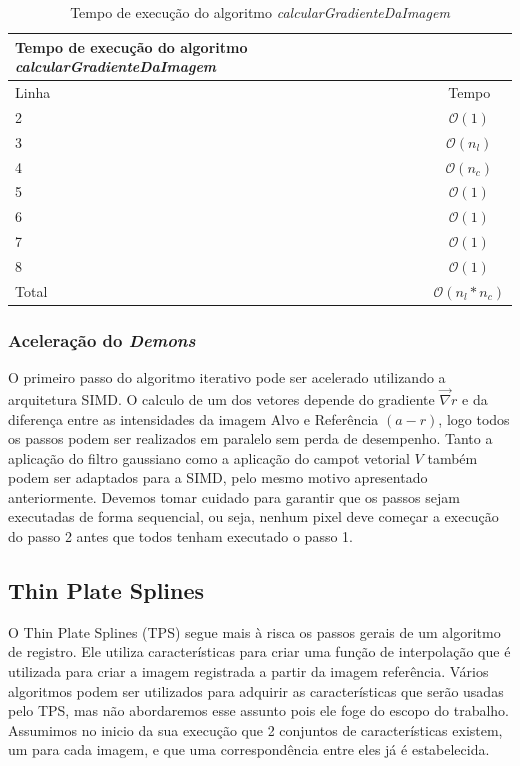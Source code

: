 \begin{table}[H]
\begin{center}
\begin{tabular}{l|c}
\hline
Tempo de execução do algoritmo \textit{calcularGradienteDaImagem} \\
\hline
Linha&Tempo\\
\hline
2       &$\mathcal{O}(1)$ \\
3       &$\mathcal{O}(n_l)$ \\
4       &$\mathcal{O}(n_c)$\\
5       &$\mathcal{O}(1)$\\
6       &$\mathcal{O}(1)$\\
7       &$\mathcal{O}(1)$\\
8       &$\mathcal{O}(1)$\\
\hline
Total   &$\mathcal{O}(n_l*n_c)$\\
\hline
\end{tabular}
\caption{Tempo de execução do algoritmo \textit{calcularGradienteDaImagem}}
\label{table:interpolar}
\end{center}
\end{table}

\subsubsection{Aceleração do \textit{Demons}}
    O primeiro passo do algoritmo iterativo pode ser acelerado utilizando a arquitetura SIMD. O calculo de um dos vetores
depende do gradiente $\vec{\nabla}r$ e da diferença entre as intensidades da imagem Alvo e Referência $(a - r)$, logo
todos os passos podem ser realizados em paralelo sem perda de desempenho. Tanto a aplicação do filtro gaussiano como
a aplicação do campot vetorial $V$ também podem ser adaptados para a SIMD, pelo mesmo motivo apresentado anteriormente.
Devemos tomar cuidado para garantir que os passos sejam executadas de forma sequencial, ou seja, nenhum pixel deve começar
a execução do passo 2 antes que todos tenham executado o passo 1.

\subsection{Thin Plate Splines}
    O Thin Plate Splines (TPS) segue mais à risca os passos gerais de um algoritmo de registro. Ele utiliza
características para criar uma função de interpolação que é utilizada para criar a imagem registrada a partir
da imagem referência. Vários algoritmos podem ser utilizados para adquirir as características que serão usadas
pelo TPS, mas não abordaremos esse assunto pois ele foge do escopo do trabalho. Assumimos no inicio da sua
execução que 2 conjuntos de características existem, um para cada imagem, e que uma correspondência entre
eles já é estabelecida.

